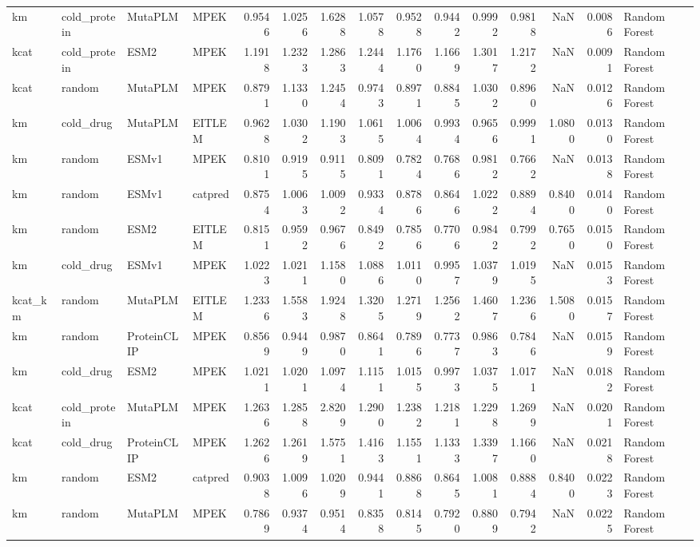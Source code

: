\begin{tabular}{llllrrrrrrrrrrl}
km & cold_protein & MutaPLM & MPEK & 0.9546 & 1.0256 & 1.6288 & 1.0578 & 0.9528 & 0.9442 & 0.9992 & 0.9818 & NaN & 0.0086 & Random Forest \\
kcat & cold_protein & ESM2 & MPEK & 1.1918 & 1.2323 & 1.2863 & 1.2444 & 1.1760 & 1.1669 & 1.3017 & 1.2172 & NaN & 0.0091 & Random Forest \\
kcat & random & MutaPLM & MPEK & 0.8791 & 1.1330 & 1.2454 & 0.9743 & 0.8971 & 0.8845 & 1.0302 & 0.8960 & NaN & 0.0126 & Random Forest \\
km & cold_drug & MutaPLM & EITLEM & 0.9628 & 1.0302 & 1.1903 & 1.0615 & 1.0064 & 0.9934 & 0.9656 & 0.9991 & 1.0800 & 0.0130 & Random Forest \\
km & random & ESMv1 & MPEK & 0.8101 & 0.9195 & 0.9115 & 0.8091 & 0.7824 & 0.7686 & 0.9812 & 0.7662 & NaN & 0.0138 & Random Forest \\
km & random & ESMv1 & catpred & 0.8754 & 1.0063 & 1.0092 & 0.9334 & 0.8786 & 0.8646 & 1.0222 & 0.8894 & 0.8400 & 0.0140 & Random Forest \\
km & random & ESM2 & EITLEM & 0.8151 & 0.9592 & 0.9676 & 0.8492 & 0.7856 & 0.7706 & 0.9842 & 0.7992 & 0.7650 & 0.0150 & Random Forest \\
km & cold_drug & ESMv1 & MPEK & 1.0223 & 1.0211 & 1.1580 & 1.0886 & 1.0110 & 0.9957 & 1.0379 & 1.0195 & NaN & 0.0153 & Random Forest \\
kcat_km & random & MutaPLM & EITLEM & 1.2336 & 1.5583 & 1.9248 & 1.3205 & 1.2719 & 1.2562 & 1.4607 & 1.2366 & 1.5080 & 0.0157 & Random Forest \\
km & random & ProteinCLIP & MPEK & 0.8569 & 0.9449 & 0.9870 & 0.8641 & 0.7896 & 0.7737 & 0.9863 & 0.7846 & NaN & 0.0159 & Random Forest \\
km & cold_drug & ESM2 & MPEK & 1.0211 & 1.0201 & 1.0974 & 1.1151 & 1.0155 & 0.9973 & 1.0375 & 1.0171 & NaN & 0.0182 & Random Forest \\
kcat & cold_protein & MutaPLM & MPEK & 1.2636 & 1.2858 & 2.8209 & 1.2900 & 1.2382 & 1.2181 & 1.2298 & 1.2699 & NaN & 0.0201 & Random Forest \\
kcat & cold_drug & ProteinCLIP & MPEK & 1.2626 & 1.2619 & 1.5751 & 1.4163 & 1.1551 & 1.1333 & 1.3397 & 1.1660 & NaN & 0.0218 & Random Forest \\
km & random & ESM2 & catpred & 0.9038 & 1.0096 & 1.0209 & 0.9441 & 0.8868 & 0.8645 & 1.0081 & 0.8884 & 0.8400 & 0.0223 & Random Forest \\
km & random & MutaPLM & MPEK & 0.7869 & 0.9374 & 0.9514 & 0.8358 & 0.8145 & 0.7920 & 0.8809 & 0.7942 & NaN & 0.0225 & Random Forest \\

\end{tabular}

